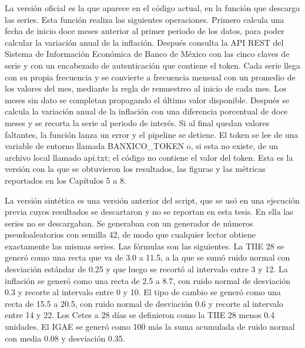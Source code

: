 La versión oficial es la que aparece en el código actual, en la función que descarga las series. Esta función realiza las siguientes operaciones. Primero calcula una fecha de inicio doce meses anterior al primer periodo de los datos, para poder calcular la variación anual de la inflación. Después consulta la API REST del Sistema de Información Económica de Banco de México con las cinco claves de serie y con un encabezado de autenticación que contiene el token. Cada serie llega con su propia frecuencia y se convierte a frecuencia mensual con un promedio de los valores del mes, mediante la regla de remuestreo al inicio de cada mes. Los meses sin dato se completan propagando el último valor disponible. Después se calcula la variación anual de la inflación con una diferencia porcentual de doce meses y se recorta la serie al periodo de interés. Si al final quedan valores faltantes, la función lanza un error y el pipeline se detiene. El token se lee de una variable de entorno llamada BANXICO\_TOKEN o, si esta no existe, de un archivo local llamado api.txt; el código no contiene el valor del token. Esta es la versión con la que se obtuvieron los resultados, las figuras y las métricas reportados en los Capítulos 5 a 8.

La versión sintética es una versión anterior del script, que se usó en una ejecución previa cuyos resultados se descartaron y no se reportan en esta tesis. En ella las series no se descargaban. Se generaban con un generador de números pseudoaleatorios con semilla 42, de modo que cualquier lector obtiene exactamente las mismas series. Las fórmulas son las siguientes. La TIIE 28 se generó como una recta que va de 3.0 a 11.5, a la que se sumó ruido normal con desviación estándar de 0.25 y que luego se recortó al intervalo entre 3 y 12. La inflación se generó como una recta de 2.5 a 8.7, con ruido normal de desviación 0.3 y recorte al intervalo entre 0 y 10. El tipo de cambio se generó como una recta de 15.5 a 20.5, con ruido normal de desviación 0.6 y recorte al intervalo entre 14 y 22. Los Cetes a 28 días se definieron como la TIIE 28 menos 0.4 unidades. El IGAE se generó como 100 más la suma acumulada de ruido normal con media 0.08 y desviación 0.35.

